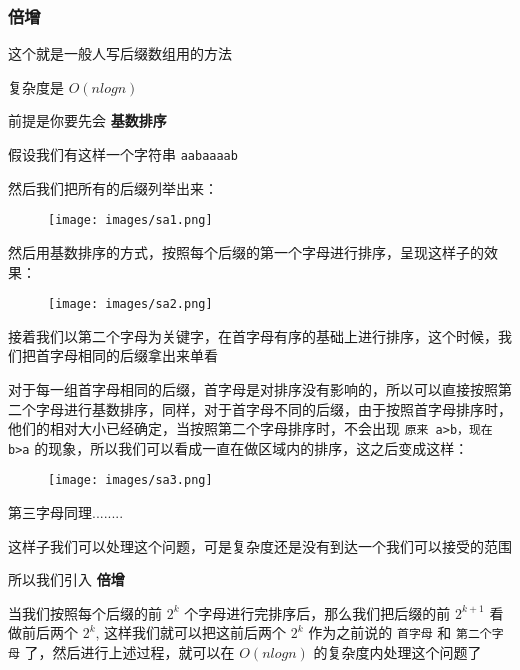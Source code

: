 \subsubsection{倍增}

这个就是一般人写后缀数组用的方法

复杂度是 $O(nlogn)$ 

前提是你要先会 \textbf{ 基数排序 }

假设我们有这样一个字符串 \texttt{aabaaaab}

然后我们把所有的后缀列举出来：

\begin{figure}[h]
\centering
\texttt{[image: images/sa1.png]} 

\end{figure}

然后用基数排序的方式，按照每个后缀的第一个字母进行排序，呈现这样子的效果：

\begin{figure}[h]
\centering
\texttt{[image: images/sa2.png]} 

\end{figure}

接着我们以第二个字母为关键字，在首字母有序的基础上进行排序，这个时候，我们把首字母相同的后缀拿出来单看

对于每一组首字母相同的后缀，首字母是对排序没有影响的，所以可以直接按照第二个字母进行基数排序，同样，对于首字母不同的后缀，由于按照首字母排序时，他们的相对大小已经确定，当按照第二个字母排序时，不会出现 \texttt{原来 a>b，现在 b>a} 的现象，所以我们可以看成一直在做区域内的排序，这之后变成这样：

\begin{figure}[h]
\centering
\texttt{[image: images/sa3.png]} 

\end{figure}

第三字母同理........

这样子我们可以处理这个问题，可是复杂度还是没有到达一个我们可以接受的范围

所以我们引入 \textbf{ 倍增 }

当我们按照每个后缀的前 $2^k$ 个字母进行完排序后，那么我们把后缀的前 $2^{k+1}$ 看做前后两个 $2^k$, 这样我们就可以把这前后两个 $2^k$ 作为之前说的 \texttt{首字母} 和 \texttt{第二个字母} 了，然后进行上述过程，就可以在 $O(nlogn)$ 的复杂度内处理这个问题了

